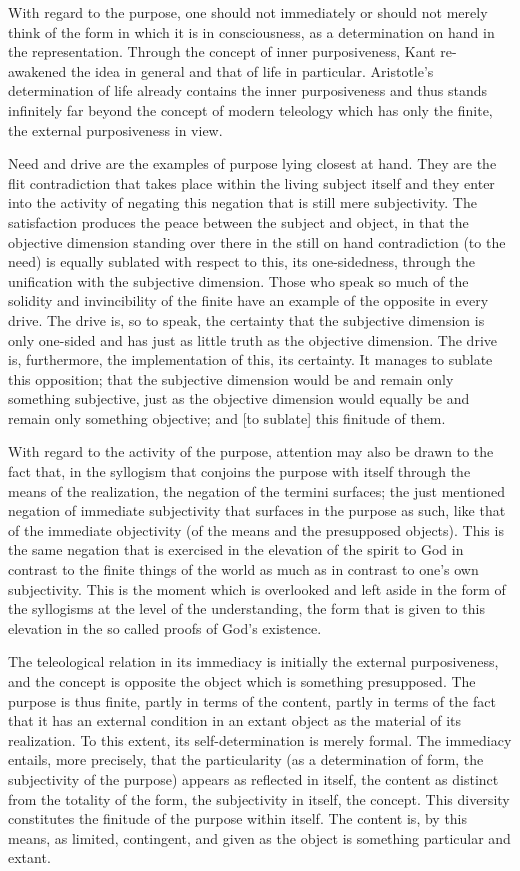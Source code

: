 With regard to the purpose, one should not immediately or
should not merely think of the form in which it is in consciousness,
as a determination on hand in the representation.
Through the concept of inner purposiveness,
Kant re-awakened the idea in general and that of life in particular.
Aristotle's determination of life already contains the inner purposiveness and
thus stands infinitely far beyond the concept of modern teleology
which has only the finite, the external purposiveness in view.

Need and drive are the examples of purpose lying closest at hand.
They are the flit contradiction that takes place within the living
subject itself and they enter into the activity of negating this
negation that is still mere subjectivity.
The satisfaction produces the peace between the subject and object,
in that the objective dimension standing over there in the still on hand
contradiction (to the need) is equally sublated with respect to this,
its one-sidedness, through the unification with the subjective dimension.
Those who speak so much of the solidity and invincibility of
the finite have an example of the opposite in every drive.
The drive is, so to speak, the certainty that the subjective dimension
is only one-sided and has just as little truth as the objective dimension.
The drive is, furthermore, the implementation of this, its certainty.
It manages to sublate this opposition;
that the subjective dimension would be and remain only something subjective,
just as the objective dimension would equally be and remain only something objective;
and [to sublate] this finitude of them.

With regard to the activity of the purpose,
attention may also be drawn to the fact that,
in the syllogism that conjoins the purpose with itself
through the means of the realization,
the negation of the termini surfaces;
the just mentioned negation of immediate subjectivity
that surfaces in the purpose as such,
like that of the immediate objectivity
(of the means and the presupposed objects).
This is the same negation that is exercised
in the elevation of the spirit to God
in contrast to the finite things of the world
as much as in contrast to one's own subjectivity.
This is the moment which is overlooked
and left aside in the form of the syllogisms
at the level of the understanding,
the form that is given to this elevation
in the so called proofs of God's existence.

The teleological relation in its immediacy is initially the external purposiveness,
and the concept is opposite the object which is something presupposed.
The purpose is thus finite, partly in terms of the content,
partly in terms of the fact that it has an external condition
in an extant object as the material of its realization.
To this extent, its self-determination is merely formal.
The immediacy entails, more precisely, that the particularity
(as a determination of form, the subjectivity of the purpose)
appears as reflected in itself, the content as distinct from
the totality of the form, the subjectivity in itself, the concept.
This diversity constitutes the finitude of the purpose within itself.
The content is, by this means, as limited, contingent, and
given as the object is something particular and extant.

